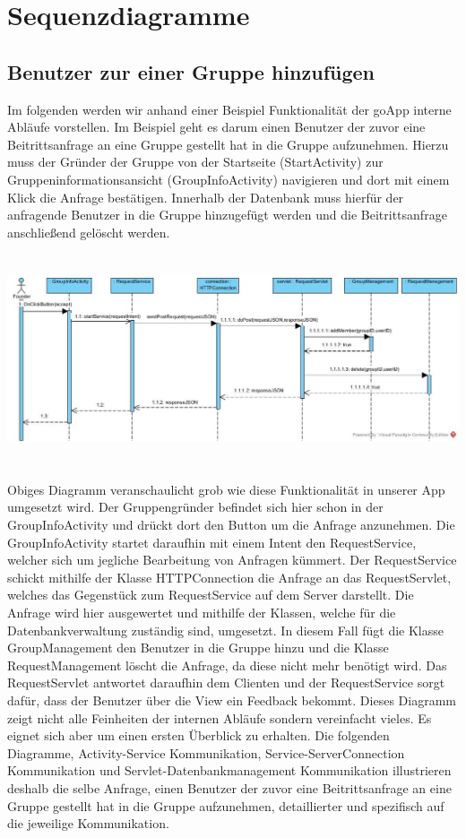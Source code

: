 \section{Sequenzdiagramme}

\subsection{Benutzer zur einer Gruppe hinzufügen}
Im folgenden werden wir anhand einer Beispiel Funktionalität der goApp interne Abläufe vorstellen.
Im Beispiel geht es darum einen Benutzer der zuvor eine Beitrittsanfrage an eine Gruppe gestellt hat in die Gruppe aufzunehmen.
Hierzu muss der Gründer der Gruppe von der Startseite (StartActivity) zur Gruppeninformationsansicht (GroupInfoActivity) navigieren und dort mit einem Klick die Anfrage bestätigen.
Innerhalb der Datenbank muss hierfür der anfragende Benutzer in die Gruppe hinzugefügt werden und die Beitrittsanfrage anschließend gelöscht werden.
\ \\
\ \\
\ \\
\includegraphics[width=1.1\textwidth]{addMemberSequenceDiagram.jpg}
\ \\
\ \\
Obiges Diagramm veranschaulicht grob wie diese Funktionalität in unserer App umgesetzt wird.
Der Gruppengründer befindet sich hier schon in der GroupInfoActivity und drückt dort den Button um die Anfrage anzunehmen.
Die GroupInfoActivity startet daraufhin mit einem Intent den RequestService, welcher sich um jegliche Bearbeitung von Anfragen kümmert.
Der RequestService schickt mithilfe der Klasse HTTPConnection die Anfrage an das RequestServlet, welches das Gegenstück zum RequestService auf dem Server darstellt.
Die Anfrage wird hier ausgewertet und mithilfe der Klassen, welche für die Datenbankverwaltung zuständig sind, umgesetzt. In diesem Fall fügt die Klasse GroupManagement den Benutzer in die Gruppe hinzu und die Klasse RequestManagement löscht die Anfrage, da diese nicht mehr benötigt wird.
Das RequestServlet antwortet daraufhin dem Clienten und der RequestService sorgt dafür, dass der Benutzer über die View ein Feedback bekommt. \newline
Dieses Diagramm zeigt nicht alle Feinheiten der internen Abläufe sondern vereinfacht vieles. Es eignet sich aber um einen ersten Überblick zu erhalten.
Die folgenden Diagramme, Activity-Service Kommunikation, Service-ServerConnection Kommunikation und Servlet-Datenbankmanagement Kommunikation illustrieren deshalb die selbe Anfrage, einen Benutzer der zuvor eine Beitrittsanfrage an eine Gruppe gestellt hat in die Gruppe aufzunehmen, detaillierter und spezifisch auf die jeweilige Kommunikation.

